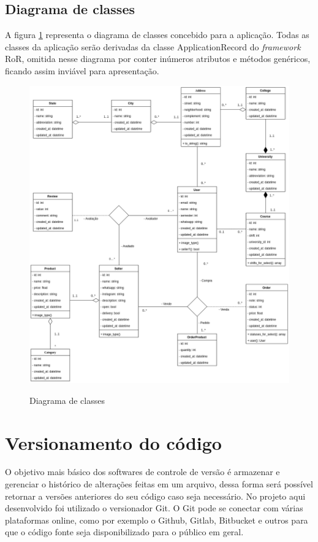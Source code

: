 \subsection{Diagrama de classes}
A figura \ref{fig:class} representa o diagrama de classes concebido para a aplicação. Todas as classes da aplicação serão derivadas da classe ApplicationRecord do \textit{framework} RoR, omitida nesse diagrama por conter inúmeros atributos e métodos genéricos, ficando assim inviável para apresentação.
\begin{figure}[htbp!]
  \centering
  \caption{Diagrama de classes}
  \includegraphics[width=1\textwidth]{figs/class.png}
    \label{fig:class}
\end{figure}

\section{Versionamento do código}
O objetivo mais básico dos softwares de controle de versão é armazenar e gerenciar o histórico de alterações feitas em um arquivo, dessa forma será possível retornar a versões anteriores do seu código caso seja necessário. No projeto aqui desenvolvido foi utilizado o versionador Git. O Git pode se conectar com várias plataformas online, como por exemplo o Github, Gitlab, Bitbucket e outros para que o código fonte seja disponibilizado para o público em geral.

